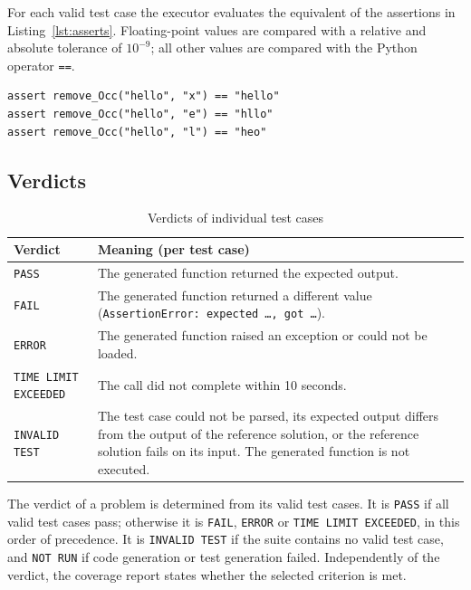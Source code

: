 \documentclass[11pt, a4paper]{article}
\begin{document}
For each valid test case the executor evaluates the equivalent of the assertions in Listing~\ref{lst:asserts}. Floating-point values are compared with a relative and absolute tolerance of $10^{-9}$; all other values are compared with the Python operator \texttt{==}.

\begin{lstlisting}[style=python, caption={Assertions evaluated for task 11}, label={lst:asserts}]
assert remove_Occ("hello", "x") == "hello"
assert remove_Occ("hello", "e") == "hllo"
assert remove_Occ("hello", "l") == "heo"
\end{lstlisting}

\subsection{Verdicts}

\begin{table}[H]
    \centering
    \small
    \begin{tabularx}{\textwidth}{>{\raggedright\arraybackslash}p{4.2cm}X}
        \toprule
        \textbf{Verdict} & \textbf{Meaning (per test case)} \\
        \midrule
        \texttt{PASS} & The generated function returned the expected output. \\
        \texttt{FAIL} & The generated function returned a different value (\texttt{AssertionError: expected \ldots, got \ldots}). \\
        \texttt{ERROR} & The generated function raised an exception or could not be loaded. \\
        \texttt{TIME LIMIT EXCEEDED} & The call did not complete within 10 seconds. \\
        \texttt{INVALID TEST} & The test case could not be parsed, its expected output differs from the output of the reference solution, or the reference solution fails on its input. The generated function is not executed. \\
        \bottomrule
    \end{tabularx}
    \caption{Verdicts of individual test cases}
\end{table}

The verdict of a problem is determined from its valid test cases. It is \texttt{PASS} if all valid test cases pass; otherwise it is \texttt{FAIL}, \texttt{ERROR} or \texttt{TIME LIMIT EXCEEDED}, in this order of precedence. It is \texttt{INVALID TEST} if the suite contains no valid test case, and \texttt{NOT RUN} if code generation or test generation failed. Independently of the verdict, the coverage report states whether the selected criterion is met.
\end{document}
